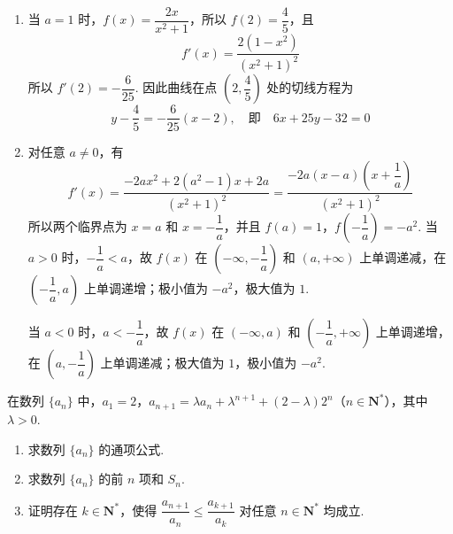 \begin{solution}
\begin{enumerate}
\item 当 \(a=1\) 时，\(f(x)=\dfrac{2x}{x^2+1}\)，所以 \(f(2)=\dfrac{4}{5}\)，且
\[f'(x)=\dfrac{2(1-x^2)}{(x^2+1)^2}\]
所以 \(f'(2)=-\dfrac{6}{25}\).
因此曲线在点 \(\left(2,\dfrac{4}{5}\right)\) 处的切线方程为
\[y-\dfrac{4}{5}=-\dfrac{6}{25}(x-2),\quad\text{即}\quad 6x+25y-32=0\]
\item 对任意 \(a\neq0\)，有
\[f'(x)=\dfrac{-2a x^2+2(a^2-1)x+2a}{(x^2+1)^2}=\dfrac{-2a(x-a)\left(x+\dfrac{1}{a}\right)}{(x^2+1)^2}\]
所以两个临界点为 \(x=a\) 和 \(x=-\dfrac{1}{a}\)，并且
\(f(a)=1\)，\(f\left(-\dfrac{1}{a}\right)=-a^2\).
当 \(a>0\) 时，\(-\dfrac{1}{a}<a\)，故 \(f(x)\) 在 \(\left(-\infty,-\dfrac{1}{a}\right)\) 和 \((a,+\infty)\) 上单调递减，在 \(\left(-\dfrac{1}{a},a\right)\) 上单调递增；极小值为 \(-a^2\)，极大值为 \(1\).

当 \(a<0\) 时，\(a<-\dfrac{1}{a}\)，故 \(f(x)\) 在 \(\left(-\infty,a\right)\) 和 \(\left(-\dfrac{1}{a},+\infty\right)\) 上单调递增，在 \(\left(a,-\dfrac{1}{a}\right)\) 上单调递减；极大值为 \(1\)，极小值为 \(-a^2\).
\end{enumerate}
\end{solution}

\begin{problem}
在数列 \(\{a_{n}\}\) 中，\(a_{1} = 2\)，\(a_{n+1} = \lambda a_{n} + \lambda^{n+1} + (2 - \lambda)2^{n}\)（\(n \in \mathbf{N}^{*}\)），其中 \(\lambda > 0\).

\begin{enumerate}
\item 求数列 \(\{a_{n}\}\) 的通项公式.
\item 求数列 \(\{a_{n}\}\) 的前 \(n\) 项和 \(S_{n}\).
\item 证明存在 \(k \in \mathbf{N}^{*}\)，使得 \(\dfrac{a_{n+1}}{a_n} \leqslant \dfrac{a_{k+1}}{a_k}\) 对任意 \(n \in \mathbf{N}^{*}\) 均成立.
\end{enumerate}
\end{problem}

